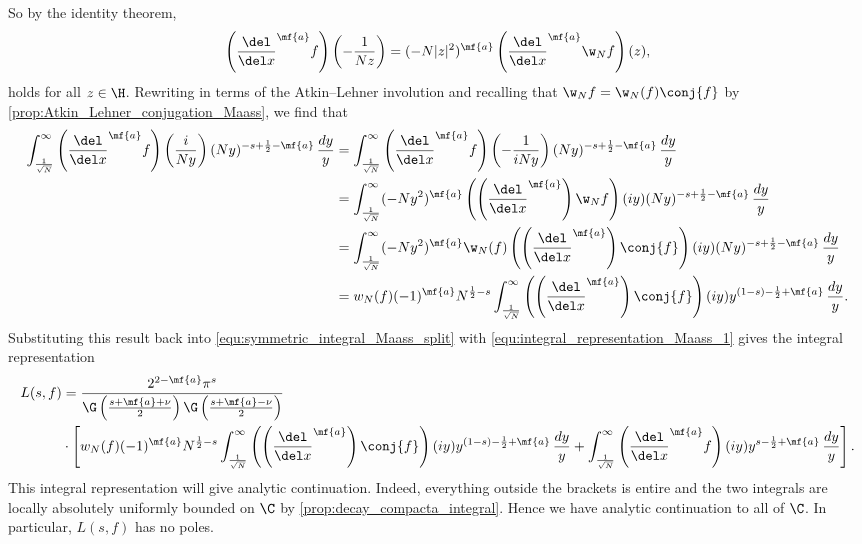       So by the identity theorem,
      \[
        \left(\frac{\del}{\del x}^{\mf{a}}f\right)\left(-\frac{1}{Nz}\right) = (-N|z|^{2})^{\mf{a}}\left(\frac{\del}{\del x}^{\mf{a}}\w_{N}f\right)(z),
      \]
      holds for all $z \in \H$. Rewriting in terms of the Atkin–Lehner involution and recalling that $\w_{N}f = \w_{N}(f)\conj{f}$ by \cref{prop:Atkin_Lehner_conjugation_Maass}, we find that
      \begin{align*}
        \int_{\frac{1}{\sqrt{N}}}^{\infty}\left(\frac{\del}{\del x}^{\mf{a}}f\right)\left(\frac{i}{Ny}\right)(Ny)^{-s+\frac{1}{2}-\mf{a}}\,\frac{dy}{y} &= \int_{\frac{1}{\sqrt{N}}}^{\infty}\left(\frac{\del}{\del x}^{\mf{a}}f\right)\left(-\frac{1}{iNy}\right)(Ny)^{-s+\frac{1}{2}-\mf{a}}\,\frac{dy}{y} \\
        &= \int_{\frac{1}{\sqrt{N}}}^{\infty}(-Ny^{2})^{\mf{a}}\left(\left(\frac{\del}{\del x}^{\mf{a}}\right)\w_{N}f\right)(iy)(Ny)^{-s+\frac{1}{2}-\mf{a}}\,\frac{dy}{y} \\
        &= \int_{\frac{1}{\sqrt{N}}}^{\infty}(-Ny^{2})^{\mf{a}}\w_{N}(f)\left(\left(\frac{\del}{\del x}^{\mf{a}}\right)\conj{f}\right)(iy)(Ny)^{-s+\frac{1}{2}-\mf{a}}\,\frac{dy}{y} \\
        &= w_{N}(f)(-1)^{\mf{a}}N^{\frac{1}{2}-s}\int_{\frac{1}{\sqrt{N}}}^{\infty}\left(\left(\frac{\del}{\del x}^{\mf{a}}\right)\conj{f}\right)(iy)y^{(1-s)-\frac{1}{2}+\mf{a}}\,\frac{dy}{y}.
      \end{align*}
      Substituting this result back into \cref{equ:symmetric_integral_Maass_split} with \cref{equ:integral_representation_Maass_1} gives the integral representation
      \begin{align*}
        L(s,f) &= \frac{2^{2-\mf{a}}\pi^{s}}{\G\left(\frac{s+\mf{a}+\nu}{2}\right)\G\left(\frac{s+\mf{a}-\nu}{2}\right)} \\
        &\cdot \left[w_{N}(f)(-1)^{\mf{a}}N^{\frac{1}{2}-s}\int_{\frac{1}{\sqrt{N}}}^{\infty}\left(\left(\frac{\del}{\del x}^{\mf{a}}\right)\conj{f}\right)(iy)y^{(1-s)-\frac{1}{2}+\mf{a}}\,\frac{dy}{y}+\int_{\frac{1}{\sqrt{N}}}^{\infty}\left(\frac{\del}{\del x}^{\mf{a}}f\right)(iy)y^{s-\frac{1}{2}+\mf{a}}\,\frac{dy}{y}\right].
      \end{align*}
      This integral representation will give analytic continuation. Indeed, everything outside the brackets is entire and the two integrals are locally absolutely uniformly bounded on $\C$ by \cref{prop:decay_compacta_integral}. Hence we have analytic continuation to all of $\C$. In particular, $L(s,f)$ has no poles.
